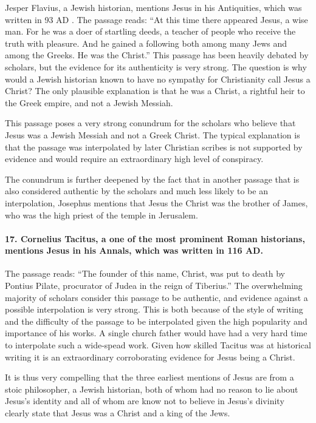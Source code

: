Jesper Flavius, a Jewish historian, mentions Jesus in his Antiquities, which was written in 93 AD .
The passage reads: ``At this time there appeared Jesus, a wise man.
For he was a doer of startling deeds, a teacher of people who receive the truth with pleasure.
And he gained a following both among many Jews and among the Greeks.
He was the Christ.'' This passage has been heavily debated by scholars, but the evidence for its authenticity is very strong.
The question is why would a Jewish historian known to have no sympathy for Christianity call Jesus a Christ?
The only plausible explanation is that he was a Christ, a rightful heir to the Greek empire, and not a Jewish Messiah.

This passage poses a very strong conundrum for the scholars who believe that Jesus was a Jewish Messiah and not a Greek Christ.
The typical explanation is that the passage was interpolated by later Christian scribes is not supported by evidence and would require an extraordinary high level of conspiracy.

The conundrum is further deepened by the fact that in another passage that is also considered authentic by the scholars and much less likely to be an interpolation, Josephus mentions that Jesus the Christ was the brother of James, who was the high priest of the temple in Jerusalem.

\paragraph{17.
Cornelius Tacitus, a one of the most prominent Roman historians, mentions Jesus in his Annals, which was written in 116 AD.}\label{par:cornelius-tacitus-a-one-of-the-most-prominent-roman-historians-mentions-jesus-in-his-annals-which-was-written-in-116-ad.}

The passage reads: ``The founder of this name, Christ, was put to death by Pontius Pilate, procurator of Judea in the reign of Tiberius.'' The overwhelming majority of scholars consider this passage to be authentic, and evidence against a possible interpolation is very strong.
This is both because of the style of writing and the difficulty of the passage to be interpolated given the high popularity and importance of his works.
A single church father would have had a very hard time to interpolate such a wide-spead work.
Given how skilled Tacitus was at historical writing it is an extraordinary corroborating evidence for Jesus being a Christ.

It is thus very compelling that the three earliest mentions of Jesus are from a stoic philosopher, a Jewish historian, both of whom had no reason to lie about Jesus's identity and all of whom are know not to believe in Jesus's divinity clearly state that Jesus was a Christ and a king of the Jews.

